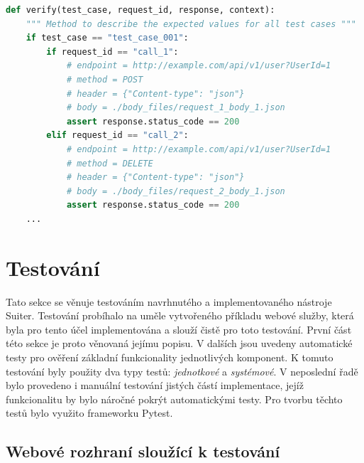 
\begin{lstlisting}[language=Python, frame=single]
def verify(test_case, request_id, response, context):
    """ Method to describe the expected values for all test cases """
    if test_case == "test_case_001":
        if request_id == "call_1":
            # endpoint = http://example.com/api/v1/user?UserId=1
            # method = POST
            # header = {"Content-type": "json"}
            # body = ./body_files/request_1_body_1.json
            assert response.status_code == 200
        elif request_id == "call_2":
            # endpoint = http://example.com/api/v1/user?UserId=1
            # method = DELETE
            # header = {"Content-type": "json"}
            # body = ./body_files/request_2_body_1.json
            assert response.status_code == 200
    ...
\end{lstlisting}



\section{Testování}


Tato sekce se věnuje testováním navrhnutého a implementovaného nástroje Suiter. Testování probíhalo na uměle vytvořeného příkladu webové služby, která byla pro tento účel implementována a slouží čistě pro toto testování. První část této sekce je proto věnovaná jejímu popisu. V dalších jsou uvedeny automatické testy pro ověření základní funkcionality jednotlivých komponent. K tomuto testování byly použity dva typy testů: \textit{jednotkové} a \textit{systémové}. V neposlední řadě bylo provedeno i manuální testování jistých částí implementace, jejíž funkcionalitu by bylo náročné pokrýt automatickými testy. Pro tvorbu těchto testů bylo využito frameworku Pytest.



\subsection*{Webové rozhraní sloužící k testování}

